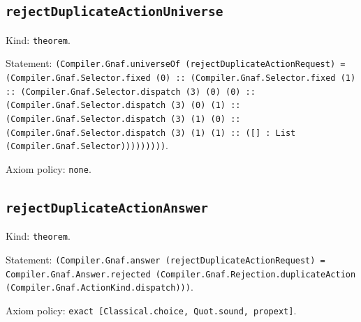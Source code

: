 \documentclass[11pt]{article}
\begin{document}
\subsection*{\texttt{rejectDuplicateActionUniverse}}
\noindent Kind: \texttt{theorem}.\par
\noindent Statement: \texttt{(Compiler.Gnaf.universeOf (rejectDuplicateActionRequest) = (Compiler.Gnaf.Selector.fixed (0) :: (Compiler.Gnaf.Selector.fixed (1) :: (Compiler.Gnaf.Selector.dispatch (3) (0) (0) :: (Compiler.Gnaf.Selector.dispatch (3) (0) (1) :: (Compiler.Gnaf.Selector.dispatch (3) (1) (0) :: (Compiler.Gnaf.Selector.dispatch (3) (1) (1) :: ([] : List (Compiler.Gnaf.Selector)))))))))}.\par
\noindent Axiom policy: \texttt{none}.\par
\subsection*{\texttt{rejectDuplicateActionAnswer}}
\noindent Kind: \texttt{theorem}.\par
\noindent Statement: \texttt{(Compiler.Gnaf.answer (rejectDuplicateActionRequest) = Compiler.Gnaf.Answer.rejected (Compiler.Gnaf.Rejection.duplicateAction (Compiler.Gnaf.ActionKind.dispatch)))}.\par
\noindent Axiom policy: \texttt{exact [Classical.choice, Quot.sound, propext]}.\par
\end{document}
